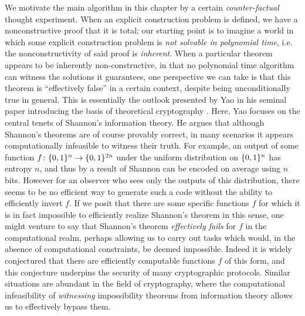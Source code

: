 We motivate the main algorithm in this chapter by a certain \emph{counter-factual} thought experiment. When an explicit construction problem is defined, we have a nonconstructive proof that it is total; our starting point is to imagine a world in which some explicit construction problem is \emph{not solvable in polynomial time}, i.e. the nonconstructivity of said proof is \emph{inherent}.
When a particular theorem appears to be inherently non-constructive, in that no polynomial time algorithm can witness the solutions it guarantees, one perspective we can take is that this theorem is ``effectively false'' in a certain context, despite being unconditionally true in general. This is essentially the outlook presented by Yao in his seminal paper introducing the basis of theoretical cryptography \cite{Yao}. Here, Yao focuses on the central tenets of Shannon's information theory.
He argues that although Shannon's theorems are of course provably correct, in many scenarios it appears computationally infeasible to witness their truth. For example, an output of some function $f \colon\{0,1\}^n \rightarrow \{0,1\}^{2n}$ under the uniform distribution on $\{0,1\}^n$ has entropy $n$, and thus by a result of Shannon can be encoded on average using $n$ bits. However for an observer who sees only the outputs of this distribution, there seems to be no efficient way to generate such a code without the ability to efficiently invert $f$. If we posit that there are some specific functions $f$ for which it is in fact impossible to efficiently realize Shannon's theorem in this sense, one might venture to say that Shannon's theorem \emph{effectively fails} for $f$ in the computational realm, perhaps allowing us to carry out tasks which would, in the absence of computational constraints, be deemed impossible. Indeed it is widely conjectured that there are efficiently computable functions $f$ of this form, and this conjecture underpins the security of many cryptographic protocols. Similar situations are abundant in the field of cryptography, where the computational infeasibility of \emph{witnessing} impossibility theorems from information theory allows us to effectively bypass them.

